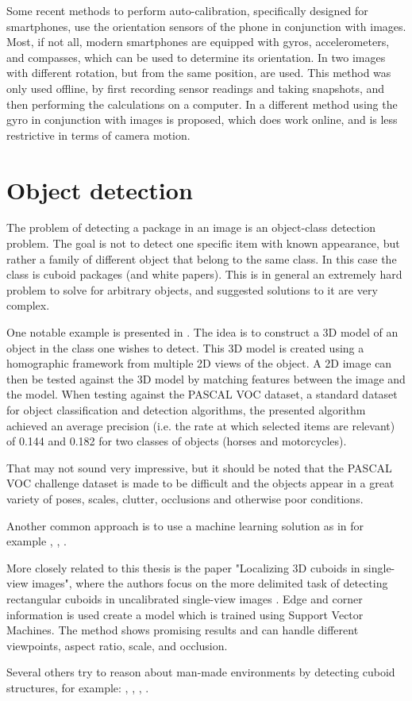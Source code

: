 Some recent methods to perform auto-calibration, specifically designed for smartphones, use the orientation sensors of the phone in conjunction with images.
Most, if not all, modern  smartphones are equipped with gyros, accelerometers, and compasses, which can be used to determine its orientation.
In \cite{saponaro2013towards} two images with different rotation, but from the same position, are used.
This method was only used offline, by first recording sensor readings and taking snapshots, and then performing the calculations on a computer.
In \cite{jia2014online} a different method using the gyro in conjunction with images is proposed, which does work online, and is less restrictive in terms of camera motion.

\section{Object detection} \label{related_work:object_detection}
The problem of detecting a package in an image is an object-class detection problem.
The goal is not to detect one specific item with known appearance, but rather a family of different object that belong to the same class.
In this case the class is cuboid packages (and white papers).
This is in general an extremely hard problem to solve for arbitrary objects, and suggested solutions to it are very complex.

One notable example is presented in \cite{yan20073d}. The idea is to construct a 3D model of an object in the class one wishes to detect.
This 3D model is created using a homographic framework from  multiple 2D views of the object.
A 2D image can then be tested against the 3D model by matching features between the image and the model. 
When testing against the PASCAL VOC dataset, a standard dataset for object classification and detection algorithms, the presented algorithm achieved an average precision (i.e. the rate at which selected items are relevant) of 0.144 and 0.182 for two classes of objects (horses and motorcycles). 

That may not sound very impressive, but it should be noted that the PASCAL VOC challenge dataset is made to be difficult and the objects appear in a great variety of poses, scales, clutter, occlusions and otherwise poor conditions.\cite{everingham2010pascal}

Another common approach is to use a machine learning solution as in for example \cite{viola2001rapid}, \cite{fergus2003object}, \cite{shottoncontour}.

More closely related to this thesis is the paper "Localizing 3D cuboids in single-view images", where the authors focus on the more delimited task of detecting rectangular cuboids in uncalibrated single-view images \cite{xiaolocalizing}.
Edge and corner information is used create a model which is trained using Support Vector Machines.
The method shows promising results and can handle different viewpoints, aspect ratio, scale, and occlusion.

Several others try to reason about man-made environments by detecting cuboid structures, for example: \cite{hedau2010thinking}, \cite{hedau2012recovering}, \cite{gupta2010estimating}, \cite{del2012bayesian}.
